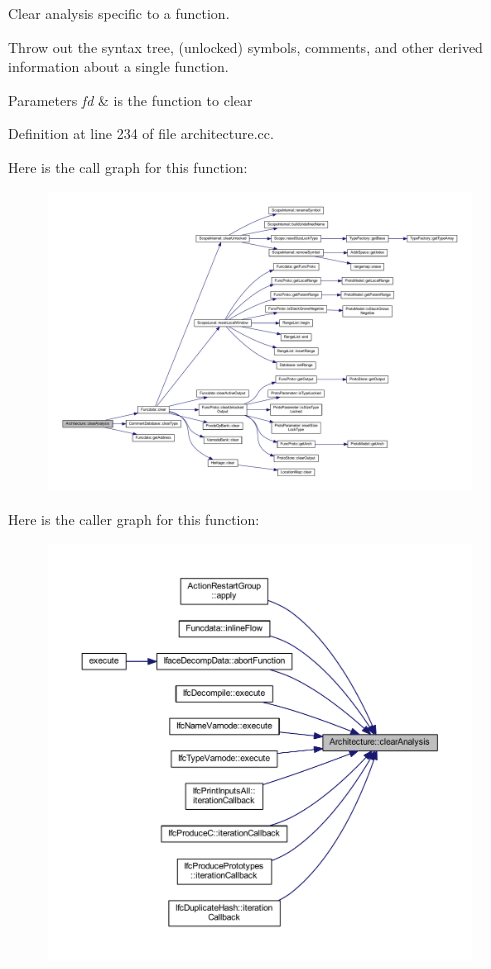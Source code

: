 Clear analysis specific to a function. 

Throw out the syntax tree, (unlocked) symbols, comments, and other derived information about a single function. 
\begin{DoxyParams}{Parameters}
{\em fd} & is the function to clear \\
\hline
\end{DoxyParams}


Definition at line 234 of file architecture.\+cc.

Here is the call graph for this function\+:
\nopagebreak
\begin{figure}[H]
\begin{center}
\leavevmode
\includegraphics[width=350pt]{class_architecture_a5cb912926505aad414d6054071a9e8d8_cgraph}
\end{center}
\end{figure}
Here is the caller graph for this function\+:
\nopagebreak
\begin{figure}[H]
\begin{center}
\leavevmode
\includegraphics[width=350pt]{class_architecture_a5cb912926505aad414d6054071a9e8d8_icgraph}
\end{center}
\end{figure}
